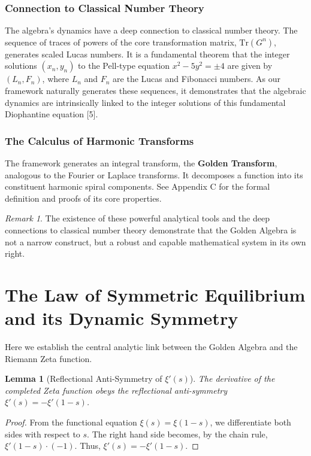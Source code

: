 \documentclass{article}
\theoremstyle{plain}
\newtheorem{lemma}[theorem]{Lemma}
\theoremstyle{definition}
\theoremstyle{remark}
\newtheorem*{remark}{Remark}
\begin{document}
\subsubsection{Connection to Classical Number Theory}
The algebra's dynamics have a deep connection to classical number theory. The sequence of traces of powers of the core transformation matrix, $\text{Tr}(G^n)$, generates scaled Lucas numbers. It is a fundamental theorem that the integer solutions $(x_n, y_n)$ to the Pell-type equation $x^2 - 5y^2 = \pm 4$ are given by $(L_n, F_n)$, where $L_n$ and $F_n$ are the Lucas and Fibonacci numbers. As our framework naturally generates these sequences, it demonstrates that the algebraic dynamics are intrinsically linked to the integer solutions of this fundamental Diophantine equation [5].

\subsubsection{The Calculus of Harmonic Transforms}
The framework generates an integral transform, the \textbf{Golden Transform}, analogous to the Fourier or Laplace transforms. It decomposes a function into its constituent harmonic spiral components. See Appendix C for the formal definition and proofs of its core properties.

\begin{remark}
The existence of these powerful analytical tools and the deep connections to classical number theory demonstrate that the Golden Algebra is not a narrow construct, but a robust and capable mathematical system in its own right.
\end{remark}

\section{The Law of Symmetric Equilibrium and its Dynamic Symmetry}
Here we establish the central analytic link between the Golden Algebra and the Riemann Zeta function.

\begin{lemma}[Reflectional Anti-Symmetry of $\xi'(s)$]
\label{thm:xi_anti_symmetry}
The derivative of the completed Zeta function obeys the reflectional anti-symmetry $\xi'(s) = -\xi'(1-s)$.
\end{lemma}
\begin{proof}
From the functional equation $\xi(s) = \xi(1-s)$, we differentiate both sides with respect to $s$. The right hand side becomes, by the chain rule, $\xi'(1-s) \cdot (-1)$. Thus, $\xi'(s) = -\xi'(1-s)$.
\end{proof}
\end{document}
